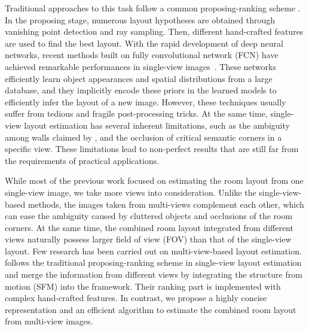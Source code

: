 Traditional approaches to this task follow a common proposing-ranking scheme \cite{hedau2009recovering,wang2013discriminative,gupta2010estimating,hedau2010thinking}. In the proposing stage, numerous layout hypotheses are obtained through vanishing point detection and ray sampling. Then, different hand-crafted features are used to find the best layout. 
With the rapid development of deep neural networks, recent methods built on fully convolutional network (FCN) have achieved remarkable performances in single-view images~\cite{mallya2015learning,dasgupta2016delay,ren2016coarse,zhao2017physics,LeeRoomNet17}. These networks efficiently learn object appearances and spatial distributions from a large database, and they implicitly encode these priors in the learned models to efficiently infer the layout of a new image. 
%
However, these techniques usually suffer from tedious and fragile post-processing tricks. At the same time, single-view layout estimation has several inherent limitations, such as the ambiguity among walls claimed by \cite{dasgupta2016delay}, and the occlusion of critical semantic corners in a specific view. These limitations lead to non-perfect results that are still far from the requirements of practical applications.

%
While most of the previous work focused on estimating the room layout from one single-view image, we take more views into consideration. Unlike the single-view-based methods, the images taken from multi-views complement each other, which can ease the ambiguity caused by cluttered objects and occlusions of the room corners. At the same time, the combined room layout integrated from different views naturally possess larger field of view (FOV) than that of the single-view layout. 
%
Few research has been carried out on multi-view-based layout estimation. \cite{bao2014understanding} follows the traditional proposing-ranking scheme in single-view layout estimation and merge the information from different views by integrating the structure from motion (SFM) into the framework. Their ranking part is implemented with complex hand-crafted features. 
%
In contrast, we propose a highly concise representation and an efficient algorithm to estimate the combined room layout from multi-view images.


